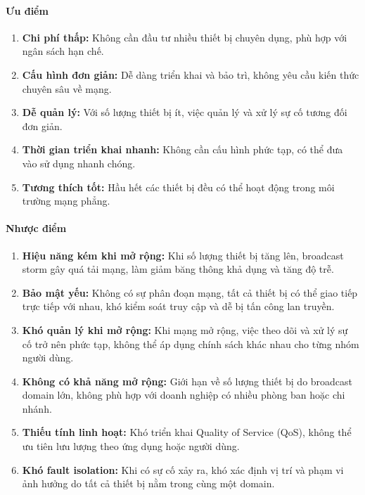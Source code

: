 \paragraph{Ưu điểm}
\begin{enumerate}
    \item \textbf{Chi phí thấp:} Không cần đầu tư nhiều thiết bị chuyên dụng, phù hợp với ngân sách hạn chế.
    \item \textbf{Cấu hình đơn giản:} Dễ dàng triển khai và bảo trì, không yêu cầu kiến thức chuyên sâu về mạng.
    \item \textbf{Dễ quản lý:} Với số lượng thiết bị ít, việc quản lý và xử lý sự cố tương đối đơn giản.
    \item \textbf{Thời gian triển khai nhanh:} Không cần cấu hình phức tạp, có thể đưa vào sử dụng nhanh chóng.
    \item \textbf{Tương thích tốt:} Hầu hết các thiết bị đều có thể hoạt động trong môi trường mạng phẳng.
\end{enumerate}

\paragraph{Nhược điểm}
\begin{enumerate}
    \item \textbf{Hiệu năng kém khi mở rộng:} Khi số lượng thiết bị tăng lên, broadcast storm gây quá tải mạng, làm giảm băng thông khả dụng và tăng độ trễ.
    \item \textbf{Bảo mật yếu:} Không có sự phân đoạn mạng, tất cả thiết bị có thể giao tiếp trực tiếp với nhau, khó kiểm soát truy cập và dễ bị tấn công lan truyền.
    \item \textbf{Khó quản lý khi mở rộng:} Khi mạng mở rộng, việc theo dõi và xử lý sự cố trở nên phức tạp, không thể áp dụng chính sách khác nhau cho từng nhóm người dùng.
    \item \textbf{Không có khả năng mở rộng:} Giới hạn về số lượng thiết bị do broadcast domain lớn, không phù hợp với doanh nghiệp có nhiều phòng ban hoặc chi nhánh.
    \item \textbf{Thiếu tính linh hoạt:} Khó triển khai Quality of Service (QoS), không thể ưu tiên lưu lượng theo ứng dụng hoặc người dùng.
    \item \textbf{Khó fault isolation:} Khi có sự cố xảy ra, khó xác định vị trí và phạm vi ảnh hưởng do tất cả thiết bị nằm trong cùng một domain.
\end{enumerate}

